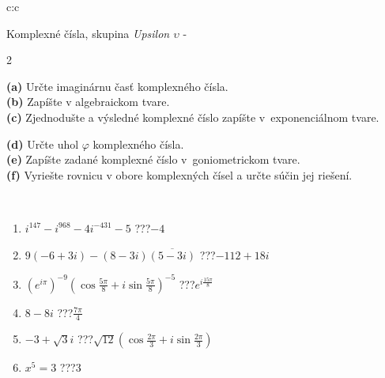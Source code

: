 \documentclass[10pt]{report}
\begin{document}
\begin{tabular}{c:c}
\begin{minipage}[c][104.5mm][t]{0.5\linewidth}
\begin{center}
\vspace{7mm}
{\huge Komplexné čísla, skupina \textit{Upsilon $\upsilon$} -}\\[5mm]
\begin{minipage}{0.95\linewidth}
\begin{center}
{\small \begin{multicols}{2} \raggedright
\textbf{(a)} Určte imaginárnu časť komplexného čísla. \\[1mm]
\textbf{(b)} Zapíšte v algebraickom tvare. \\[1mm]
\textbf{(c)} Zjednodušte a výsledné komplexné číslo zapíšte v~exponenciálnom tvare. \par \columnbreak
\textbf{(d)} Určte uhol \(\varphi\) komplexného čísla. \\[1mm]
\textbf{(e)} Zapíšte zadané komplexné číslo v~goniometrickom tvare. \\[1mm]
\textbf{(f)} Vyriešte rovnicu v obore komplexných čísel a určte súčin jej riešení.
\end{multicols}
}
\end{center}
\end{minipage}
\\[4mm]
\begin{minipage}{0.79\linewidth}
\begin{center}
\begin{varwidth}{\linewidth}
\begin{enumerate}
\large
\item $i^{147}-i^{968}-4i^{-431}-5$\quad \dotfill\; ???\;\dotfill \quad $-4$
\item $9(-6+3i)-(8-3i)\overline{(5-3i)}$\quad \dotfill\; ???\;\dotfill \quad $-112+18i$
\item $\left(e^{i\pi}\right)^{-9}\left(\cos{\frac{5\pi}{8}}+i\sin{\frac{5\pi}{8}}\right)^{-5}$\quad \dotfill\; ???\;\dotfill \quad $e^{i\frac{15\pi}{8}}$
\item $8-8i$\quad \dotfill\; ???\;\dotfill \quad $\frac{7\pi}{4}$
\item $-3+\sqrt{3}i$\quad \dotfill\; ???\;\dotfill \quad $\sqrt{12}\left(\cos{\frac{2\pi}{3}}+i\sin{\frac{2\pi}{3}}\right)$
\item $x^5=3$\quad \dotfill\; ???\;\dotfill \quad $3$
\end{enumerate}
\end{varwidth}

\end{center}
\end{minipage}
\end{center}
\end{minipage}
\end{tabular}
\end{document}
